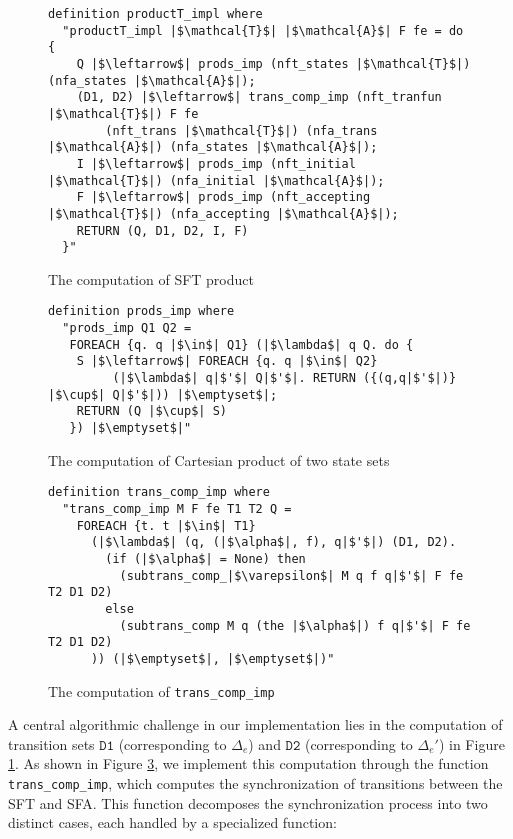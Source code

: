 \documentclass[a4paper,UKenglish,cleveref, autoref, thm-restate]{lipics-v2021}
\begin{document}
\begin{figure}[hbt!]
	\begin{lstlisting}
definition productT_impl where
  "productT_impl |$\mathcal{T}$| |$\mathcal{A}$| F fe = do {
    Q |$\leftarrow$| prods_imp (nft_states |$\mathcal{T}$|) (nfa_states |$\mathcal{A}$|);
    (D1, D2) |$\leftarrow$| trans_comp_imp (nft_tranfun |$\mathcal{T}$|) F fe 
        (nft_trans |$\mathcal{T}$|) (nfa_trans |$\mathcal{A}$|) (nfa_states |$\mathcal{A}$|);
    I |$\leftarrow$| prods_imp (nft_initial |$\mathcal{T}$|) (nfa_initial |$\mathcal{A}$|);
    F |$\leftarrow$| prods_imp (nft_accepting |$\mathcal{T}$|) (nfa_accepting |$\mathcal{A}$|);
    RETURN (Q, D1, D2, I, F)
  }"
\end{lstlisting}
\caption{The computation of SFT product}
\label{fig-compute-nft-product}
\end{figure}



\begin{figure}[hbt!]
	\begin{lstlisting}
definition prods_imp where
  "prods_imp Q1 Q2 =
   FOREACH {q. q |$\in$| Q1} (|$\lambda$| q Q. do {
    S |$\leftarrow$| FOREACH {q. q |$\in$| Q2}
         (|$\lambda$| q|$'$| Q|$'$|. RETURN ({(q,q|$'$|)} |$\cup$| Q|$'$|)) |$\emptyset$|;
    RETURN (Q |$\cup$| S)
   }) |$\emptyset$|"
\end{lstlisting}
\caption{The computation of Cartesian product of two state sets}
\label{fig-def-prods_imp}
\end{figure}



\begin{figure}[hbt!]
	\begin{lstlisting}
definition trans_comp_imp where
  "trans_comp_imp M F fe T1 T2 Q =
    FOREACH {t. t |$\in$| T1}
      (|$\lambda$| (q, (|$\alpha$|, f), q|$'$|) (D1, D2). 
        (if (|$\alpha$| = None) then 
          (subtrans_comp_|$\varepsilon$| M q f q|$'$| F fe T2 D1 D2)
        else 
          (subtrans_comp M q (the |$\alpha$|) f q|$'$| F fe T2 D1 D2)
      )) (|$\emptyset$|, |$\emptyset$|)"
\end{lstlisting}
\caption{The computation of \texttt{trans\_comp\_imp}}
\label{fig-def-prods-imp}
\end{figure}

A central algorithmic challenge in our implementation lies in the computation of transition sets $\texttt{D1}$ (corresponding to $\Delta_e$) and $\texttt{D2}$ (corresponding to $\Delta_e'$) in Figure \ref{fig-compute-nft-product}. As shown in Figure \ref{fig-def-prods-imp}, we implement this computation through the function \texttt{trans\_comp\_imp}, which computes the synchronization of transitions between the SFT and SFA. This function decomposes the synchronization process into two distinct cases, each handled by a specialized function:
\end{document}
